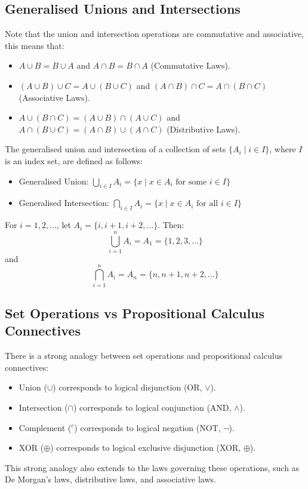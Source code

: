 \subsection{Generalised Unions and Intersections}
Note that the union and intersection operations are commutative and associative, this means that:
\begin{itemize}[itemsep=1pt,label=$\circ$]
    \item $A \cup B = B \cup A$ and $A \cap B = B \cap A$ (Commutative Laws).
    \item $(A \cup B) \cup C = A \cup (B \cup C)$ and $(A \cap B) \cap C = A \cap (B \cap C)$ (Associative Laws).
    \item $A \cup (B \cap C) = (A \cup B) \cap (A \cup C)$ and $A \cap (B \cup C) = (A \cap B) \cup (A \cap C)$ (Distributive Laws).
\end{itemize}

\begin{definition}
    The generalised union and intersection of a collection of sets $\{A_i \mid i \in I\}$, where $I$ is an index set, are defined as follows:
    \begin{itemize}[itemsep=1pt,label=$\circ$]
        \item Generalised Union: $\bigcup_{i \in I} A_i = \{x \mid x \in A_i \text{ for some } i \in I\}$
        \item Generalised Intersection: $\bigcap_{i \in I} A_i = \{x \mid x \in A_i \text{ for all } i \in I\}$
    \end{itemize}
\end{definition}

\begin{eg}
    For $i = 1,2,\ldots$, let $A_i = \{i, i + 1, i + 2, \ldots\}$. Then:
    \[ \bigcup_{i=1}^{n} A_i = A_1 = \{1, 2, 3, \ldots\} \]
    and
    \[ \bigcap_{i=1}^{n} A_i = A_n = \{n, n + 1, n + 2, \ldots\} \]
\end{eg}

\subsection{Set Operations vs Propositional Calculus Connectives}
There is a strong analogy between set operations and propositional calculus connectives:
\begin{itemize}[itemsep=1pt,label=$\circ$]
    \item Union ($\cup$) corresponds to logical disjunction (OR, $\lor$).
    \item Intersection ($\cap$) corresponds to logical conjunction (AND, $\land$).
    \item Complement ($^c$) corresponds to logical negation (NOT, $\neg$).
    \item XOR ($\oplus$) corresponds to logical exclusive disjunction (XOR, $\oplus$).
\end{itemize}
This strong analogy also extends to the laws governing these operations, such as De Morgan's laws, distributive laws, and associative laws.

